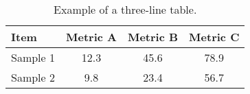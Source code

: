 \begin{table}[H]
    \centering
    \caption{Example of a three-line table.}
    \begin{tabular}{lccc}
    \toprule
    Item & Metric A & Metric B & Metric C \\
    \midrule
    Sample 1 & 12.3 & 45.6 & 78.9 \\
    Sample 2 & 9.8  & 23.4 & 56.7 \\
    \bottomrule
    \end{tabular}
    \label{tab:table2}
\end{table}
    